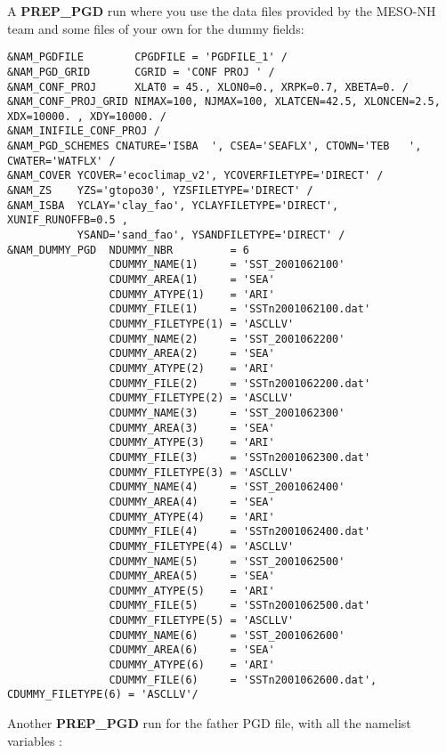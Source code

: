 A {\bf PREP\_PGD} run where you use the data files provided by the MESO-NH team and some files of your own for the dummy fields:
\begin{verbatim}
&NAM_PGDFILE        CPGDFILE = 'PGDFILE_1' /
&NAM_PGD_GRID       CGRID = 'CONF PROJ ' /
&NAM_CONF_PROJ      XLAT0 = 45., XLON0=0., XRPK=0.7, XBETA=0. /
&NAM_CONF_PROJ_GRID NIMAX=100, NJMAX=100, XLATCEN=42.5, XLONCEN=2.5, XDX=10000. , XDY=10000. /
&NAM_INIFILE_CONF_PROJ /
&NAM_PGD_SCHEMES CNATURE='ISBA  ', CSEA='SEAFLX', CTOWN='TEB   ', CWATER='WATFLX' /
&NAM_COVER YCOVER='ecoclimap_v2', YCOVERFILETYPE='DIRECT' /
&NAM_ZS    YZS='gtopo30', YZSFILETYPE='DIRECT' /
&NAM_ISBA  YCLAY='clay_fao', YCLAYFILETYPE='DIRECT',  XUNIF_RUNOFFB=0.5 ,
           YSAND='sand_fao', YSANDFILETYPE='DIRECT' /
&NAM_DUMMY_PGD  NDUMMY_NBR         = 6
                CDUMMY_NAME(1)     = 'SST_2001062100'          
                CDUMMY_AREA(1)     = 'SEA'
                CDUMMY_ATYPE(1)    = 'ARI'
                CDUMMY_FILE(1)     = 'SSTn2001062100.dat'          
                CDUMMY_FILETYPE(1) = 'ASCLLV'
                CDUMMY_NAME(2)     = 'SST_2001062200'          
                CDUMMY_AREA(2)     = 'SEA'
                CDUMMY_ATYPE(2)    = 'ARI'
                CDUMMY_FILE(2)     = 'SSTn2001062200.dat'          
                CDUMMY_FILETYPE(2) = 'ASCLLV'
                CDUMMY_NAME(3)     = 'SST_2001062300'          
                CDUMMY_AREA(3)     = 'SEA'
                CDUMMY_ATYPE(3)    = 'ARI'
                CDUMMY_FILE(3)     = 'SSTn2001062300.dat'          
                CDUMMY_FILETYPE(3) = 'ASCLLV'
                CDUMMY_NAME(4)     = 'SST_2001062400'          
                CDUMMY_AREA(4)     = 'SEA'
                CDUMMY_ATYPE(4)    = 'ARI'
                CDUMMY_FILE(4)     = 'SSTn2001062400.dat'          
                CDUMMY_FILETYPE(4) = 'ASCLLV'
                CDUMMY_NAME(5)     = 'SST_2001062500'          
                CDUMMY_AREA(5)     = 'SEA'
                CDUMMY_ATYPE(5)    = 'ARI'
                CDUMMY_FILE(5)     = 'SSTn2001062500.dat'          
                CDUMMY_FILETYPE(5) = 'ASCLLV'
                CDUMMY_NAME(6)     = 'SST_2001062600'          
                CDUMMY_AREA(6)     = 'SEA'
                CDUMMY_ATYPE(6)    = 'ARI'
                CDUMMY_FILE(6)     = 'SSTn2001062600.dat', CDUMMY_FILETYPE(6) = 'ASCLLV'/
\end{verbatim}
\newpage
Another {\bf PREP\_PGD} run for the father PGD file, with all the namelist variables : 
